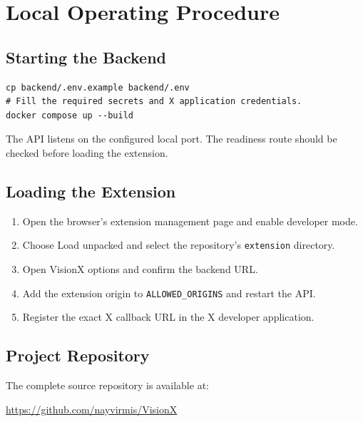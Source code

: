 \documentclass[11pt,a4paper]{report}
\newcommand{\code}[1]{\texttt{#1}}
\begin{document}
\appendix
\chapter{Local Operating Procedure}

\section{Starting the Backend}
\begin{lstlisting}[style=visionx]
cp backend/.env.example backend/.env
# Fill the required secrets and X application credentials.
docker compose up --build
\end{lstlisting}

The API listens on the configured local port. The readiness route should be
checked before loading the extension.

\section{Loading the Extension}
\begin{enumerate}
  \item Open the browser's extension management page and enable developer mode.
  \item Choose Load unpacked and select the repository's \code{extension}
  directory.
  \item Open VisionX options and confirm the backend URL.
  \item Add the extension origin to \code{ALLOWED\_ORIGINS} and restart the API.
  \item Register the exact X callback URL in the X developer application.
\end{enumerate}

\section{Project Repository}
The complete source repository is available at:

\begin{center}
\url{https://github.com/nayvirmis/VisionX}
\end{center}
\end{document}
